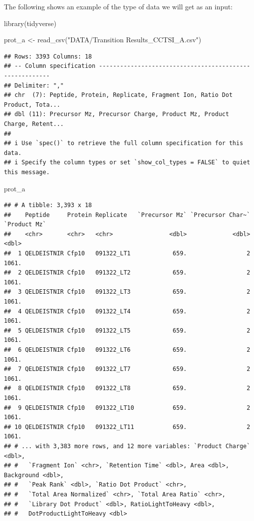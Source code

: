 \documentclass[
]{book}
\newenvironment{Shaded}{\begin{snugshade}}{\end{snugshade}}
\newcommand{\FunctionTok}[1]{\textcolor[rgb]{0.00,0.00,0.00}{#1}}
\newcommand{\NormalTok}[1]{#1}
\newcommand{\OtherTok}[1]{\textcolor[rgb]{0.56,0.35,0.01}{#1}}
\newcommand{\StringTok}[1]{\textcolor[rgb]{0.31,0.60,0.02}{#1}}
\begin{document}
The following shows an example of the
type of data we will get as an input:

\begin{Shaded}
\begin{Highlighting}[]
\FunctionTok{library}\NormalTok{(tidyverse)}

\NormalTok{prot\_a }\OtherTok{\textless{}{-}} \FunctionTok{read\_csv}\NormalTok{(}\StringTok{"DATA/Transition Results\_CCTSI\_A.csv"}\NormalTok{)}
\end{Highlighting}
\end{Shaded}

\begin{verbatim}
## Rows: 3393 Columns: 18
## -- Column specification --------------------------------------------------------
## Delimiter: ","
## chr  (7): Peptide, Protein, Replicate, Fragment Ion, Ratio Dot Product, Tota...
## dbl (11): Precursor Mz, Precursor Charge, Product Mz, Product Charge, Retent...
## 
## i Use `spec()` to retrieve the full column specification for this data.
## i Specify the column types or set `show_col_types = FALSE` to quiet this message.
\end{verbatim}

\begin{Shaded}
\begin{Highlighting}[]
\NormalTok{prot\_a}
\end{Highlighting}
\end{Shaded}

\begin{verbatim}
## # A tibble: 3,393 x 18
##    Peptide     Protein Replicate   `Precursor Mz` `Precursor Char~` `Product Mz`
##    <chr>       <chr>   <chr>                <dbl>             <dbl>        <dbl>
##  1 QELDEISTNIR Cfp10   091322_LT1            659.                 2        1061.
##  2 QELDEISTNIR Cfp10   091322_LT2            659.                 2        1061.
##  3 QELDEISTNIR Cfp10   091322_LT3            659.                 2        1061.
##  4 QELDEISTNIR Cfp10   091322_LT4            659.                 2        1061.
##  5 QELDEISTNIR Cfp10   091322_LT5            659.                 2        1061.
##  6 QELDEISTNIR Cfp10   091322_LT6            659.                 2        1061.
##  7 QELDEISTNIR Cfp10   091322_LT7            659.                 2        1061.
##  8 QELDEISTNIR Cfp10   091322_LT8            659.                 2        1061.
##  9 QELDEISTNIR Cfp10   091322_LT10           659.                 2        1061.
## 10 QELDEISTNIR Cfp10   091322_LT11           659.                 2        1061.
## # ... with 3,383 more rows, and 12 more variables: `Product Charge` <dbl>,
## #   `Fragment Ion` <chr>, `Retention Time` <dbl>, Area <dbl>, Background <dbl>,
## #   `Peak Rank` <dbl>, `Ratio Dot Product` <chr>,
## #   `Total Area Normalized` <chr>, `Total Area Ratio` <chr>,
## #   `Library Dot Product` <dbl>, RatioLightToHeavy <dbl>,
## #   DotProductLightToHeavy <dbl>
\end{verbatim}
\end{document}
